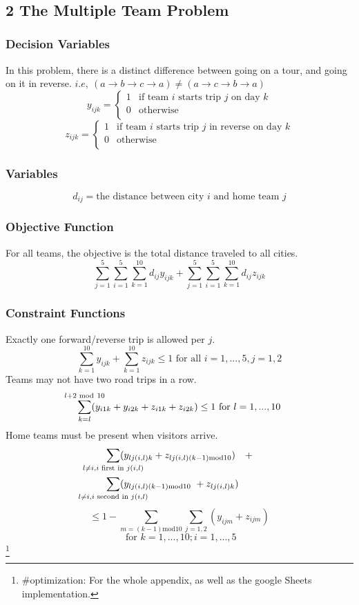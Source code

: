 \documentclass[twoside]{article}
\begin{document}
\newpage
\
\subsection*{2 The Multiple Team Problem}
\subsubsection*{Decision Variables}
In this problem, there is a distinct difference between going on a tour, and going on it in reverse. $i.e, \ (a \to b\to c\to a ) \neq (a \to c \to b\to a)$
$$ y_{ijk} = 
\begin{cases} 
	1 & \textrm{if team $i$ starts trip $j$ on day $k$} \\
	0 & \textrm{otherwise} \\
\end{cases}$$
$$ z_{ijk} = 
\begin{cases} 
	1 & \textrm{if team $i$ starts trip $j$ in reverse on day $k$} \\
	0 & \textrm{otherwise} \\
\end{cases}$$
\subsubsection*{Variables}
$$ d_{ij} = \textrm{the distance between city $i$ and home team $j$} $$
\subsubsection*{Objective Function}
For all teams, the objective is the total distance traveled to all cities.
$$ \sum_{j=1}^{5}\sum_{i=1}^{5}\sum_{k=1}^{10}d_{ij}y_{ijk} + \sum_{j=1}^{5}\sum_{i=1}^5\sum_{k=1}^{10} d_{ij}z_{ijk} $$
\subsubsection*{Constraint Functions}
Exactly one forward/reverse trip is allowed per $j$. 
$$ \sum_{k=1}^{10}y_{ijk} + \sum_{k=1}^{10}z_{ijk} \leq 1 \textrm{ for all $i = 1 , ... , 5, j = 1,2$}$$
Teams may not have two road trips in a row.
$$ \sum_{k=l}^{\mathclap{l + 2 \textrm{ mod}  \ 10}} (y_{i1k} + y_{i2k} + z_{i1k} + z_{i2k} ) \leq 1 \textrm{ for $l = 1,...,10$}$$
Home teams must be present when visitors arrive.
\begin{align*}
\sum_{\mathclap{l \neq i, i \textrm{ first in }j(i,l)}} &(y_{lj(i,l)k} + z_{lj(i,l)(k-1)\textrm{mod}10}) \quad + \\
\sum_{\mathclap{l \neq i, i \textrm{ second in }j(i,l)}} &(y_{lj(i,l)(k-1)\textrm{mod}10} \ + z_{lj(i,l)k}) 
\end{align*}
$$\leq 1 - \sum_{{m=(k-1)\textrm{mod}10}} \sum_{j=1,2}(y_{ijm} + z_{ijm}) $$
$$\textrm{ for $k = 1, ..., 10; i = 1,...,5$}$$\footnote{\#optimization: For the whole appendix, as well as the google Sheets implementation.}

\newpage
{}
\onecolumn


\nocite{*}

\end{document}
